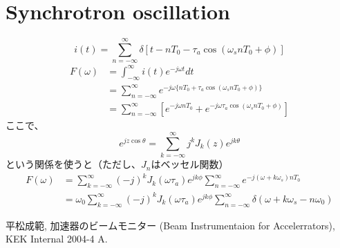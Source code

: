 \documentclass[]{jlreq}
\theoremstyle{definition}
\begin{document}
\section{Synchrotron oscillation}
\begin{equation}
  i(t) = \sum_{n=-\infty}^{\infty}\delta[t - n T_0 - \tau_a \cos(\omega_s n T_0 + \phi)]
\end{equation}
%
\begin{align}
  F(\omega) &= \int_{-\infty}^{\infty} i(t) e^{-j\omega t} dt \\
  &= \sum_{n = -\infty}^{\infty} e^{-j\omega\{n T_0 + \tau_a \cos(\omega_s n T_0 + \phi)\}} \\
  &= \sum_{n = -\infty}^{\infty} \left[ e^{-j\omega n T_0 }+ e^{-j \omega \tau_a \cos(\omega_s n T_0 + \phi)} \right]
\end{align}
%
ここで、
%
\begin{equation}
  e^{jz\cos\theta} = \sum_{k = -\infty}^{\infty} j^k J_k(z) e^{j k \theta}
\end{equation}
%
という関係を使うと（ただし、$J_n$はベッセル関数）
%
\begin{align}
  F(\omega) &= \sum_{k = -\infty}^{\infty} (-j)^k J_k(\omega \tau_a) e^{j k \phi} \sum_{n = -\infty}^{\infty} e^{-j (\omega + k \omega_s) n T_0} \\
    &= \omega_0 \sum_{k = -\infty}^{\infty} (-j)^k J_k(\omega \tau_a) e^{j k \phi} \sum_{n = -\infty}^{\infty} \delta(\omega + k\omega_s - n \omega_0)
\end{align}
%
\begin{thebibliography}{9}
  平松成範, 加速器のビームモニター (Beam Instrumentaion for Accelerrators), KEK Internal 2004-4 A.
\end{thebibliography}
%
\end{document}
